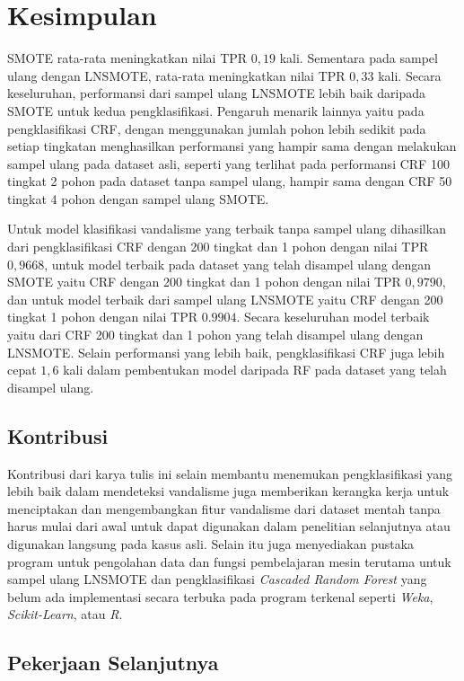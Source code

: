 \chapter{Kesimpulan}

SMOTE rata-rata meningkatkan nilai TPR $0,19$ kali.
Sementara pada sampel ulang dengan LNSMOTE, rata-rata meningkatkan nilai TPR
$0,33$ kali.
Secara keseluruhan, performansi dari sampel ulang LNSMOTE lebih baik daripada
SMOTE untuk kedua pengklasifikasi.
Pengaruh menarik lainnya yaitu pada pengklasifikasi CRF, dengan menggunakan
jumlah pohon lebih sedikit pada setiap tingkatan menghasilkan performansi yang
hampir sama dengan melakukan sampel ulang pada dataset asli, seperti yang
terlihat pada performansi CRF 100 tingkat 2 pohon pada dataset tanpa sampel
ulang, hampir sama dengan CRF 50 tingkat 4 pohon dengan sampel ulang SMOTE.

Untuk model klasifikasi vandalisme yang terbaik tanpa sampel ulang dihasilkan
dari pengklasifikasi CRF dengan 200 tingkat dan 1 pohon dengan nilai TPR $0,9668$,
untuk model terbaik pada dataset yang telah disampel ulang dengan SMOTE yaitu
CRF dengan 200 tingkat dan 1 pohon dengan nilai TPR $0,9790$,
dan untuk model terbaik dari sampel ulang LNSMOTE yaitu CRF dengan 200 tingkat
1 pohon dengan nilai TPR $0.9904$.
Secara keseluruhan model terbaik yaitu dari CRF 200 tingkat dan 1 pohon yang
telah disampel ulang dengan LNSMOTE.
Selain performansi yang lebih baik, pengklasifikasi CRF juga lebih cepat $1,6$
kali dalam pembentukan model daripada RF pada dataset yang telah disampel
ulang.

\section{Kontribusi}

Kontribusi dari karya tulis ini selain membantu menemukan pengklasifikasi yang
lebih baik dalam mendeteksi vandalisme juga memberikan kerangka kerja untuk
menciptakan dan mengembangkan fitur vandalisme dari dataset mentah tanpa harus
mulai dari awal untuk dapat digunakan dalam penelitian selanjutnya atau
digunakan langsung pada kasus asli. Selain itu juga menyediakan pustaka program
untuk pengolahan data dan fungsi pembelajaran mesin terutama untuk sampel ulang
LNSMOTE dan pengklasifikasi
\textit{Cascaded Random Forest} yang belum ada implementasi secara terbuka pada
program terkenal seperti \textit{Weka}, \textit{Scikit-Learn}, atau \textit{R}.

\section{Pekerjaan Selanjutnya}

